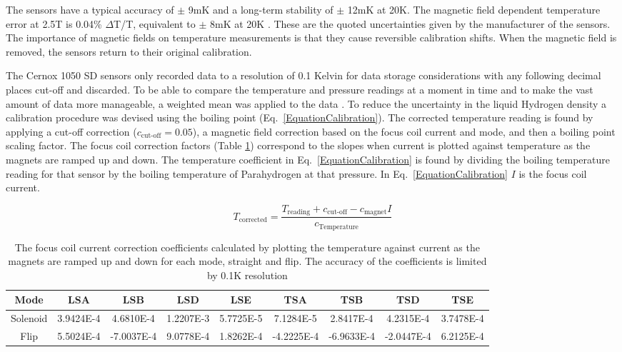   The sensors have a typical accuracy of $\mathrm{\pm}$ 9mK and a long-term stability of
 $\mathrm{\pm}$ 12mK at 20K. The magnetic field dependent
 temperature error at 2.5T is 0.04\% $\Delta$T/T, equivalent to $\mathrm{\pm}$ 8mK at 20K
 \cite{CernoxRTDs} \cite{TemperatureMeasurement}. These are the quoted uncertainties given by the manufacturer
 of the sensors. The importance of magnetic fields on temperature measurements is that they cause
 reversible calibration shifts. When the magnetic field is removed, the sensors return to their original
 calibration.

 The Cernox 1050 SD sensors only recorded data to a resolution of 0.1 Kelvin for data storage considerations with any following decimal places cut-off and discarded. To be able to compare the temperature and pressure readings at a moment in time and to make the vast amount of data more manageable, a weighted mean was applied to the data \cite{NOTE524}. To reduce the uncertainty in the liquid Hydrogen density a calibration procedure was devised using the boiling point
 (Eq.~\ref{EquationCalibration}). The corrected temperature reading is found by applying a cut-off correction ($c_\textrm{cut-off} = 0.05$), a magnetic field correction based on the focus coil current and mode, and then a boiling point scaling factor. The focus coil correction factors (Table \ref{tab:magnet}) correspond to the slopes when current is plotted against temperature as the magnets are ramped up and down. The temperature coefficient in Eq.~\ref{EquationCalibration} is found by dividing the boiling
temperature reading for that sensor by the boiling temperature of Parahydrogen at that pressure. In Eq.~\ref{EquationCalibration} $I$ is the focus coil current. 
 
\begin{equation}
T_\textrm{corrected}=\frac{T_\textrm{reading}+c_\textrm{cut-off}-c_\textrm{magnet}I}{c_\textrm{Temperature}}
\label{EquationCalibration}
\end{equation}

\begin{table}
\small
  \caption{
    The focus coil current correction coefficients calculated by plotting the temperature against current as the magnets are ramped up and down for each mode, straight and flip. The accuracy of the coefficients is limited by 0.1K resolution
  }
  \label{tab:magnet}
  \begin{center}
    \begin{tabular}{|c c c c c c c c c|}
    \hline

Mode      & LSA & LSB & LSD & LSE & TSA & TSB & TSD & TSE     \rule{0pt}{14pt} \\
\hline
Solenoid & 3.9424E-4 & 4.6810E-4 & 1.2207E-3 & 5.7725E-5 & 7.1284E-5 & 2.8417E-4 & 4.2315E-4 & 3.7478E-4
\\
Flip & 5.5024E-4 & -7.0037E-4 & 9.0778E-4 & 1.8262E-4 & -4.2225E-4 & -6.9633E-4 & -2.0447E-4 & 6.2125E-4
\\

    \hline
    \end{tabular}
  \end{center}
\end{table} 
 

